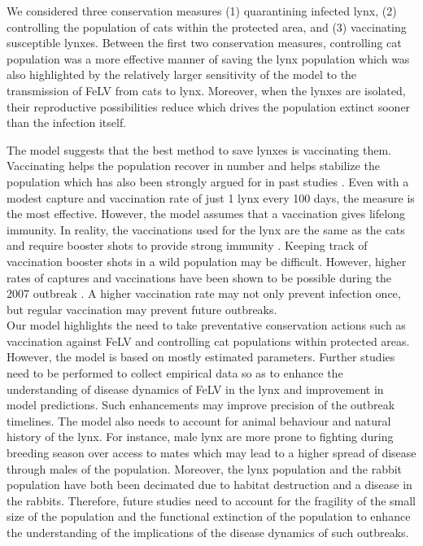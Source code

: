 \documentclass[12pt]{article}
\begin{document}
\quad We considered three conservation measures (1) quarantining infected lynx, (2) controlling the population of cats within the protected area, and (3) vaccinating susceptible lynxes. Between the first two conservation measures, controlling cat population was a more effective manner of saving the lynx population which was also highlighted by the relatively larger sensitivity of the model to the transmission of FeLV from cats to lynx. Moreover, when the lynxes are isolated, their reproductive possibilities reduce which drives the population extinct sooner than the infection itself.  

\quad The model suggests that the best method to save lynxes is vaccinating them. Vaccinating helps the population recover in number and helps stabilize the population which has also been strongly argued for in past studies \cite{meli_feline_2010}\cite{lopez_management_2009}. Even with a modest capture and vaccination rate of just 1 lynx every 100 days, the measure is the most effective. However, the model assumes that a vaccination gives lifelong immunity. In reality, the vaccinations used for the lynx are the same as the cats and require booster shots to provide strong immunity \cite{lopez_management_2009}.  Keeping track of vaccination booster shots in a wild population may be difficult. However, higher rates of captures and vaccinations have been shown to be possible during the 2007 outbreak \cite{lopez_management_2009}. A higher vaccination rate may not only prevent infection once, but regular vaccination may prevent future outbreaks. \\
 


\quad Our model highlights the need to take preventative conservation actions such as vaccination against FeLV and controlling cat populations within protected areas. However, the model is based on mostly estimated parameters. Further studies need to be performed to collect empirical data so as to enhance the understanding of disease dynamics of FeLV in the lynx and improvement in model predictions. Such enhancements may improve precision of the outbreak timelines. The model also needs to account for animal behaviour and natural history of the lynx. For instance, male lynx are more prone to fighting during breeding season over access to mates\cite{mattisson_lethal_2013} which may lead to a higher spread of disease through males of the population. Moreover, the lynx population and the rabbit population have both been decimated due to habitat destruction and a disease in the rabbits.\cite{wave_of_chaos} Therefore, future studies need to account for the fragility of the small size of the population and the functional extinction of the population to enhance the understanding of the implications of the disease dynamics of such outbreaks. 
\end{document}
